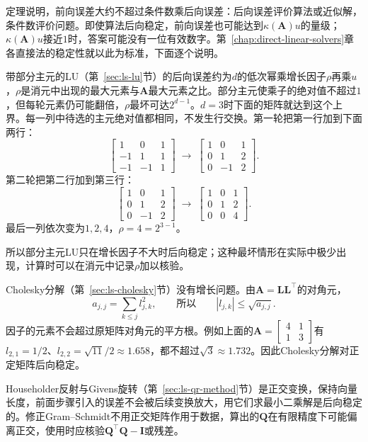 定理说明，前向误差大约不超过条件数乘后向误差：后向误差评价算法或近似解，条件数评价问题。即使算法后向稳定，前向误差也可能达到$\kappa(\bm A)u$的量级；$\kappa(\bm A)u$接近$1$时，答案可能没有一位有效数字。第~\ref{chap:direct-linear-solvers}章各直接法的稳定性就以此为标准，下面逐个说明。

带部分主元的LU（第~\ref{sec:ls-lu}节）的后向误差约为$d$的低次幂乘增长因子$\rho$再乘$u$，$\rho$是消元中出现的最大元素与$\bm A$最大元素之比。部分主元使乘子的绝对值不超过$1$，但每轮元素仍可能翻倍，$\rho$最坏可达$2^{d-1}$。$d=3$时下面的矩阵就达到这个上界。每一列中待选的主元绝对值都相同，不发生行交换。第一轮把第一行加到下面两行：
\[
 \begin{bmatrix}1&0&1\\-1&1&1\\-1&-1&1\end{bmatrix}
 \;\longrightarrow\;
 \begin{bmatrix}1&0&1\\0&1&2\\0&-1&2\end{bmatrix}.
\]
第二轮把第二行加到第三行：
\[
 \begin{bmatrix}1&0&1\\0&1&2\\0&-1&2\end{bmatrix}
 \;\longrightarrow\;
 \begin{bmatrix}1&0&1\\0&1&2\\0&0&4\end{bmatrix}.
\]
最后一列依次变为$1,2,4$，$\rho=4=2^{3-1}$。

所以部分主元LU只在增长因子不大时后向稳定；这种最坏情形在实际中极少出现，计算时可以在消元中记录$\rho$加以核验。

Cholesky分解（第~\ref{sec:ls-cholesky}节）没有增长问题。由$\bm A=\bm L\bm L^\top$的对角元，
\begin{equation}
 a_{j,j}=\sum_{k\leq j}l_{j,k}^2,\qquad\text{所以}\qquad |l_{j,k}|\leq\sqrt{a_{j,j}} .
 \label{eq:ls-cholesky-element-bound}
\end{equation}
因子的元素不会超过原矩阵对角元的平方根。例如上面的$\bm A=\left[\begin{smallmatrix}4&1\\1&3\end{smallmatrix}\right]$有$l_{2,1}=1/2$、$l_{2,2}=\sqrt{11}/2\approx1.658$，都不超过$\sqrt3\approx1.732$。因此Cholesky分解对正定矩阵后向稳定。

Householder反射与Givens旋转（第~\ref{sec:ls-qr-method}节）是正交变换，保持向量长度，前面步骤引入的误差不会被后续变换放大，用它们求最小二乘解是后向稳定的。修正Gram--Schmidt不用正交矩阵作用于数据，算出的$\bm Q$在有限精度下可能偏离正交，使用时应核验$\bm Q^\top\bm Q-\bm I$或残差。

